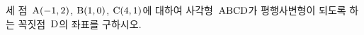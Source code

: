 세 점~$\mathrm{A}(-1{,}\mkern3mu\mathopen{}2)$, $\mathrm{B}(1{,}\mkern3mu\mathopen{}0)$, $\mathrm{C}(4{,}\mkern3mu\mathopen{}1)$에 대하여 사각형~$\mathrm{ABCD}$가 평행사변형이 되도록 하는 꼭짓점~$\mathrm{D}$의 좌표를 구하시오.

